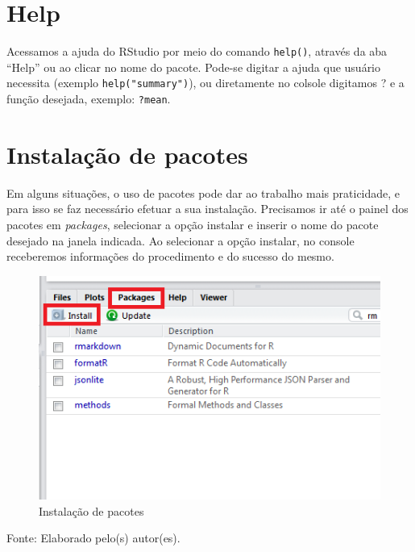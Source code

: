 \documentclass[12pt,portuguese,oneside]{book}
\begin{document}
\section{Help}\label{help}

Acessamos a ajuda do RStudio por meio do comando \texttt{help()},
através da aba ``Help'' ou ao clicar no nome do pacote. Pode-se digitar
a ajuda que usuário necessita (exemplo \texttt{help("summary")}), ou
diretamente no colsole digitamos ? e a função desejada, exemplo:
\texttt{?mean}.

\section{Instalação de pacotes}\label{instalacao-de-pacotes}

Em alguns situações, o uso de pacotes pode dar ao trabalho mais
praticidade, e para isso se faz necessário efetuar a sua instalação.
Precisamos ir até o painel dos pacotes em \emph{packages}, selecionar a
opção instalar e inserir o nome do pacote desejado na janela indicada.
Ao selecionar a opção instalar, no console receberemos informações do
procedimento e do sucesso do mesmo.

\begin{figure}[H]

{\centering \includegraphics[width=0.8\linewidth]{pacotes1} 

}

\caption{Instalação de pacotes}\label{fig:pacotes1}
\end{figure}

Fonte: Elaborado pelo(s) autor(es).
\end{document}
